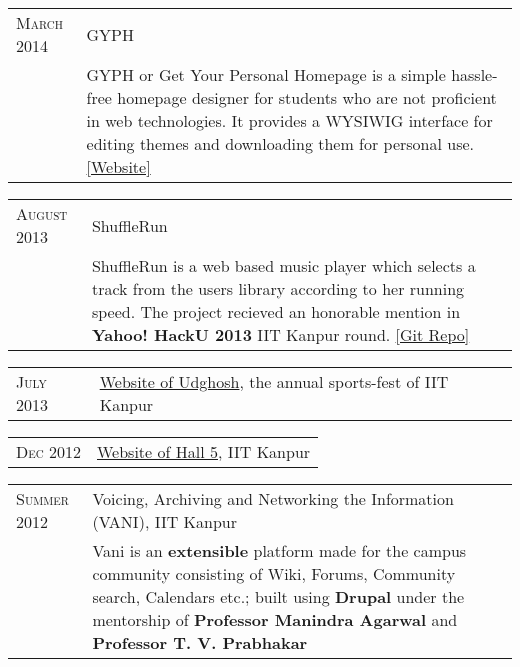 \documentclass[a4paper,10pt]{article} %
\begin{document}
\begin{tabular}{>{\raggedleft}p{2.2cm}|p{15cm}}
    \textsc{March 2014} & GYPH\\
                        & \footnotesize{GYPH or Get Your Personal Homepage
                           is a simple hassle-free homepage designer for students who are not
                           proficient in web technologies. It provides a WYSIWIG
                           interface for editing themes and downloading them for personal use.
                           \href{http://gyph2.herokuapp.com/} {[Website]} } \\
\end{tabular}

\begin{tabular}{>{\raggedleft}p{2.2cm}|p{15cm}}
    \textsc{August 2013} & ShuffleRun\\
                         & \footnotesize{ShuffleRun is a web based music player which selects a track from the
                            users library according to her running speed.
                            The project recieved an honorable mention in \textbf{Yahoo!  HackU 2013} IIT Kanpur round.
                            \href{https://github.com/srijanshetty/ShuffleRun} {[Git Repo]}}\\
\end{tabular}

\begin{tabular}{>{\raggedleft}p{2.2cm}|p{15cm}}
    \textsc{July 2013} & \href{www.udghosh.org}{Website of Udghosh}, the annual sports-fest of IIT Kanpur\\
\end{tabular}

\begin{tabular}{>{\raggedleft}p{2.2cm}|p{15cm}}
    \textsc{Dec 2012} & \href{http://www.iitk.ac.in/hall5}{Website of Hall 5}, IIT Kanpur \\
\end{tabular}

\begin{tabular}{>{\raggedleft}p{2.2cm}|p{15cm}}
    \textsc{Summer 2012} & Voicing, Archiving and Networking the Information \textsc{(VANI)}, IIT Kanpur\\
                           & \footnotesize{Vani is an \textbf{extensible} platform
                              made for the campus community consisting of Wiki, Forums,
                              Community search, Calendars etc.; built using \textbf{Drupal}
                              under the mentorship of \textbf{Professor Manindra Agarwal} and
                              \textbf{Professor T. V. Prabhakar} } \\
\end{tabular}
\end{document}
